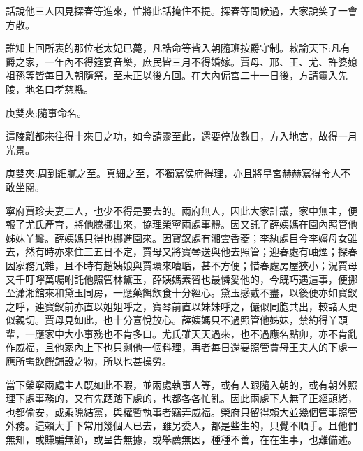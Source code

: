 

\begin{parag}
    話說他三人因見探春等進來，忙將此話掩住不提。探春等問候過，大家說笑了一會方散。
\end{parag}


\begin{parag}
    誰知上回所表的那位老太妃已薨，凡誥命等皆入朝隨班按爵守制。敕諭天下:凡有爵之家，一年內不得筵宴音樂，庶民皆三月不得婚嫁。賈母、邢、王、尤、許婆媳祖孫等皆每日入朝隨祭，至未正以後方回。在大內偏宮二十一日後，方請靈入先陵，地名曰孝慈縣。\begin{note}庚雙夾:隨事命名。\end{note}這陵離都來往得十來日之功，如今請靈至此，還要停放數日，方入地宮，故得一月光景。\begin{note}庚雙夾:周到細膩之至。真細之至，不獨寫侯府得理，亦且將皇宮赫赫寫得令人不敢坐閱。\end{note}寧府賈珍夫妻二人，也少不得是要去的。兩府無人，因此大家計議，家中無主，便報了尤氏產育，將他騰挪出來，協理榮寧兩處事體。因又託了薛姨媽在園內照管他姊妹丫鬟。薛姨媽只得也挪進園來。因寶釵處有湘雲香菱；李紈處目今李嬸母女雖去，然有時亦來住三五日不定，賈母又將寶琴送與他去照管；迎春處有岫煙；探春因家務冗雜，且不時有趙姨娘與賈環來嘈聒，甚不方便；惜春處房屋狹小；況賈母又千叮嚀萬囑咐託他照管林黛玉，薛姨媽素習也最憐愛他的，今既巧遇這事，便挪至瀟湘館來和黛玉同房，一應藥餌飲食十分經心。黛玉感戴不盡，以後便亦如寶釵之呼，連寶釵前亦直以姐姐呼之，寶琴前直以妹妹呼之，儼似同胞共出，較諸人更似親切。賈母見如此，也十分喜悅放心。薛姨媽只不過照管他姊妹，禁約得丫頭輩，一應家中大小事務也不肯多口。尤氏雖天天過來，也不過應名點卯，亦不肯亂作威福，且他家內上下也只剩他一個料理，再者每日還要照管賈母王夫人的下處一應所需飲饌鋪設之物，所以也甚操勞。
\end{parag}


\begin{parag}
    當下榮寧兩處主人既如此不暇，並兩處執事人等，或有人跟隨入朝的，或有朝外照理下處事務的，又有先跴踏下處的，也都各各忙亂。因此兩處下人無了正經頭緒，也都偷安，或乘隙結黨，與權暫執事者竊弄威福。榮府只留得賴大並幾個管事照管外務。這賴大手下常用幾個人已去，雖另委人，都是些生的，只覺不順手。且他們無知，或賺騙無節，或呈告無據，或舉薦無因，種種不善，在在生事，也難備述。
\end{parag}


